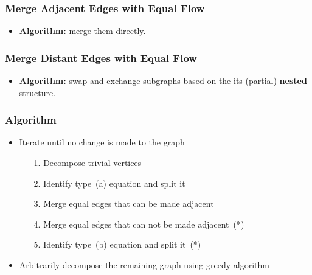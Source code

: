 \frame
{
	\frametitle{Merge Adjacent Edges with Equal Flow}
	\vspace{-2.0cm}

	\begin{itemize}
	\item {\bf Algorithm:} merge them directly.
	\end{itemize}

	\vspace{0.8cm}
	

}


\frame
{
	\frametitle{Merge Distant Edges with Equal Flow}
	\vspace{-3.0cm}

	\begin{itemize}
	\item {\bf Algorithm:} swap and exchange subgraphs based on the its (partial) {\bf nested} structure.
	\end{itemize}

	\vspace{0.8cm}
	

}

\frame
{
	\frametitle{Algorithm}
	\begin{itemize}
	\item Iterate until no change is made to the graph
		\vspace{0.2cm}
		\begin{itemize}
		\item[1.] Decompose trivial vertices
		\vspace{0.2cm}
		\item[2.] Identify type~(a) equation and split it
		\vspace{0.2cm}
		\item[3.] Merge equal edges that can be made adjacent
		\vspace{0.2cm}
		\item[4.] Merge equal edges that can not be made adjacent~(*)
		\vspace{0.2cm}
		\item[5.] Identify type~(b) equation and split it~(*)
		\vspace{0.2cm}
		\end{itemize}
	\item Arbitrarily decompose the remaining graph using greedy algorithm
	\end{itemize}
}

